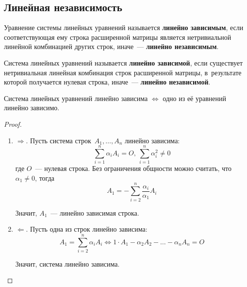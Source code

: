 \subsection{Линейная независимость}
Уравнение системы линейных уравнений называется \textbf{линейно зависимым}, если соответствующая ему строка расширенной матрицы является нетривиальной линейной комбинацией других строк, иначе~--- \textbf{линейно независимым}.

Система линейных уравнений называется \textbf{линейно зависимой}, если существует нетривиальная линейная комбинация строк расширенной матрицы, в~результате которой получается нулевая строка, иначе~--- \textbf{линейно независимой}.

\begin{statement}
Система линейных уравнений линейно зависима $\Leftrightarrow$ одно из её уравнений линейно зависимо.
\end{statement}
\begin{proof}
\begin{enumerate}
	\item $\Rightarrow$. Пусть система строк~$A_1, \ldots, A_n$ линейно зависима:
	\begin{equation*}
	\sum_{i=1}^n \alpha_i A_i = O, \ \sum_{i=1}^n \alpha_i^2 \neq 0
	\end{equation*}
	где $O$~--- нулевая строка. Без ограничения общности можно считать, что $\alpha_1 \neq 0$, тогда
	\begin{equation*}
	A_1 = -\sum_{i=2}^n \frac{\alpha_i}{\alpha_1} A_i
	\end{equation*}
	
	Значит, $A_1$~--- линейно зависимая строка.
	
	\item $\Leftarrow$. Пусть одна из строк линейно зависима:
	\begin{equation*}
	A_1 = \sum_{i=2}^n \alpha_i A_i \Leftrightarrow
	1 \cdot A_1 - \alpha_2 A_2 - \ldots - \alpha_n A_n = O
	\end{equation*}
	
	Значит, система линейно зависима.
\end{enumerate}
\end{proof}